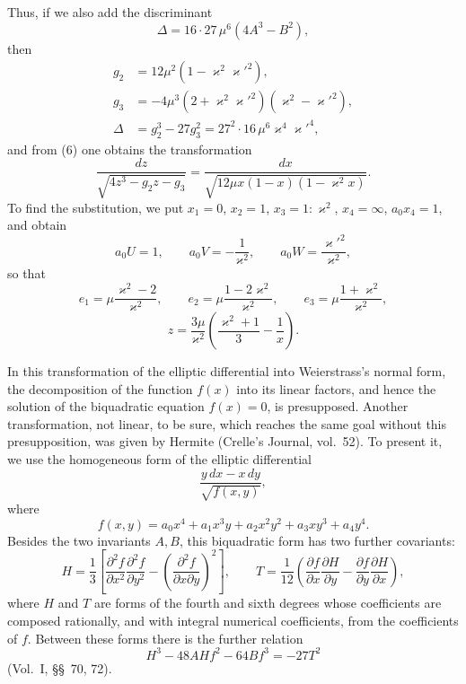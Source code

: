 \documentclass[11pt]{article}
\begin{document}
Thus, if we also add the discriminant
\[
\Delta=16\cdot 27\,\mu^6(4A^3-B^2),
\]
then
\begin{equation}
\begin{aligned}
g_2&=12\mu^2(1-\varkappa^2\varkappa'^2),\\
g_3&=-4\mu^3(2+\varkappa^2\varkappa'^2)(\varkappa^2-\varkappa'^2),\\
\Delta&=g_2^3-27g_3^2=27^2\cdot16\,\mu^6\varkappa^4\varkappa'^4,
\end{aligned}
\tag{9}
\end{equation}
and from (6) one obtains the transformation
\begin{equation}
\frac{dz}{\sqrt{4z^3-g_2z-g_3}}=
\frac{dx}{\sqrt{12\mu x(1-x)(1-\varkappa^2x)}}.
\tag{10}
\end{equation}
To find the substitution, we put $x_1=0$, $x_2=1$, $x_3=1:\varkappa^2$, $x_4=\infty$, $a_0x_4=1$, and obtain
\[
a_0U=1,
\qquad a_0V=-\frac1{\varkappa^2},
\qquad a_0W=\frac{\varkappa'^2}{\varkappa^2},
\]
so that
\[
e_1=\mu\frac{\varkappa^2-2}{\varkappa^2},\qquad
 e_2=\mu\frac{1-2\varkappa^2}{\varkappa^2},\qquad
 e_3=\mu\frac{1+\varkappa^2}{\varkappa^2},
\]
\begin{equation}
z=\frac{3\mu}{\varkappa^2}\left(\frac{\varkappa^2+1}{3}-\frac1x\right).
\tag{11}
\end{equation}

In this transformation of the elliptic differential into Weierstrass's normal form, the decomposition of the function $f(x)$ into its linear factors, and hence the solution of the biquadratic equation $f(x)=0$, is presupposed. Another transformation, not linear, to be sure, which reaches the same goal without this presupposition, was given by Hermite (Crelle's Journal, vol.~52). To present it, we use the homogeneous form of the elliptic differential
\begin{equation}
\frac{y\,dx-x\,dy}{\sqrt{f(x,y)}},
\tag{12}
\end{equation}
where
\begin{equation}
f(x,y)=a_0x^4+a_1x^3y+a_2x^2y^2+a_3xy^3+a_4y^4.
\tag{13}
\end{equation}
Besides the two invariants $A,B$, this biquadratic form has two further covariants:
\begin{equation}
H=\frac13\left[\frac{\partial^2 f}{\partial x^2}\frac{\partial^2 f}{\partial y^2}-\left(\frac{\partial^2 f}{\partial x\partial y}\right)^2\right],\qquad
T=\frac1{12}\left(\frac{\partial f}{\partial x}\frac{\partial H}{\partial y}-\frac{\partial f}{\partial y}\frac{\partial H}{\partial x}\right),
\tag{14}
\end{equation}
where $H$ and $T$ are forms of the fourth and sixth degrees whose coefficients are composed rationally, and with integral numerical coefficients, from the coefficients of $f$. Between these forms there is the further relation
\begin{equation}
H^3-48AHf^2-64Bf^3=-27T^2
\tag{15}
\end{equation}
(Vol.~I, \S\S~70, 72).
\end{document}

